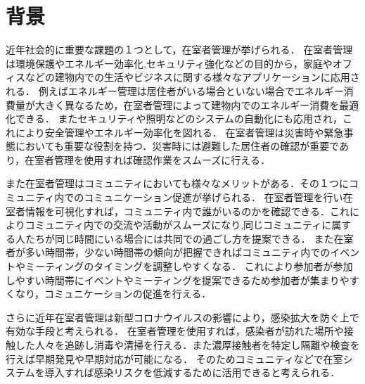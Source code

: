 





\section{背景}\label{1.1}
近年社会的に重要な課題の１つとして，在室者管理が挙げられる．
在室者管理は環境保護やエネルギー効率化,セキュリティ強化などの目的から，家庭やオフィスなどの建物内での生活やビジネスに関する様々なアプリケーションに応用される．
例えばエネルギー管理は居住者がいる場合といない場合でエネルギー消費量が大きく異なるため，在室者管理によって建物内でのエネルギー消費を最適化できる．
またセキュリティや照明などのシステムの自動化にも応用され，これにより安全管理やエネルギー効率化を図れる．
在室者管理は災害時や緊急事態においても重要な役割を持つ．災害時には避難した居住者の確認が重要であり，在室者管理を使用すれば確認作業をスムーズに行える．

また在室者管理はコミュニティにおいても様々なメリットがある．その１つにコミュニティ内でのコミュニケーション促進が挙げられる．
在室者管理を行い在室者情報を可視化すれば，コミュニティ内で誰がいるのかを確認できる．これによりコミュニティ内での交流や活動がスムーズになり,同じコミュニティに属する人たちが同じ時間にいる場合には共同での過ごし方を提案できる．
また在室者が多い時間帯，少ない時間帯の傾向が把握できればコミュニティ内でのイベントやミーティングのタイミングを調整しやすくなる．
これにより参加者が参加しやすい時間帯にイベントやミーティングを提案できるため参加者が集まりやすくなり，コミュニケーションの促進を行える．

さらに近年在室者管理は新型コロナウイルスの影響により，感染拡大を防ぐ上で有効な手段と考えられる．
在室者管理を使用すれば，感染者が訪れた場所や接触した人々を追跡し消毒や清掃を行える．また濃厚接触者を特定し隔離や検査を行えば早期発見や早期対応が可能になる．
そのためコミュニティなどで在室システムを導入すれば感染リスクを低減するために活用できると考えられる．


